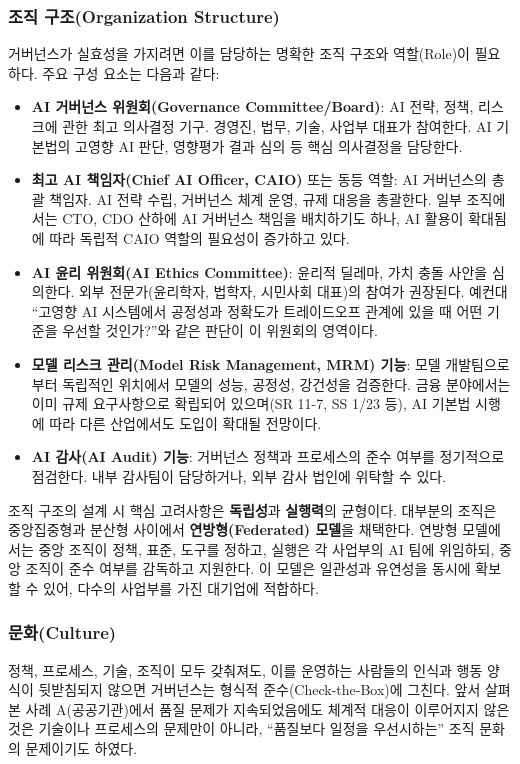 \subsubsection*{조직 구조(Organization Structure)}
거버넌스가 실효성을 가지려면 이를 담당하는 명확한 조직 구조와 역할(Role)이 필요하다. 주요 구성 요소는 다음과 같다:
\begin{itemize}
 \item \textbf{AI 거버넌스 위원회(Governance Committee/Board)}: AI 전략, 정책, 리스크에 관한 최고 의사결정 기구. 경영진, 법무, 기술, 사업부 대표가 참여한다. AI 기본법의 고영향 AI 판단, 영향평가 결과 심의 등 핵심 의사결정을 담당한다.
 \item \textbf{최고 AI 책임자(Chief AI Officer, CAIO)} 또는 동등 역할: AI 거버넌스의 총괄 책임자. AI 전략 수립, 거버넌스 체계 운영, 규제 대응을 총괄한다. 일부 조직에서는 CTO, CDO 산하에 AI 거버넌스 책임을 배치하기도 하나, AI 활용이 확대됨에 따라 독립적 CAIO 역할의 필요성이 증가하고 있다.
 \item \textbf{AI 윤리 위원회(AI Ethics Committee)}: 윤리적 딜레마, 가치 충돌 사안을 심의한다. 외부 전문가(윤리학자, 법학자, 시민사회 대표)의 참여가 권장된다. 예컨대 ``고영향 AI 시스템에서 공정성과 정확도가 트레이드오프 관계에 있을 때 어떤 기준을 우선할 것인가?''와 같은 판단이 이 위원회의 영역이다.
 \item \textbf{모델 리스크 관리(Model Risk Management, MRM) 기능}: 모델 개발팀으로부터 독립적인 위치에서 모델의 성능, 공정성, 강건성을 검증한다. 금융 분야에서는 이미 규제 요구사항으로 확립되어 있으며(SR 11-7, SS 1/23 등), AI 기본법 시행에 따라 다른 산업에서도 도입이 확대될 전망이다.
 \item \textbf{AI 감사(AI Audit) 기능}: 거버넌스 정책과 프로세스의 준수 여부를 정기적으로 점검한다. 내부 감사팀이 담당하거나, 외부 감사 법인에 위탁할 수 있다.
\end{itemize}

조직 구조의 설계 시 핵심 고려사항은 \textbf{독립성}과 \textbf{실행력}의 균형이다. 대부분의 조직은 중앙집중형과 분산형 사이에서 \textbf{연방형(Federated) 모델}을 채택한다. 연방형 모델에서는 중앙 조직이 정책, 표준, 도구를 정하고, 실행은 각 사업부의 AI 팀에 위임하되, 중앙 조직이 준수 여부를 감독하고 지원한다.\cite{mantymaki2022defining} 이 모델은 일관성과 유연성을 동시에 확보할 수 있어, 다수의 사업부를 가진 대기업에 적합하다.

\subsubsection*{문화(Culture)}
정책, 프로세스, 기술, 조직이 모두 갖춰져도, 이를 운영하는 사람들의 인식과 행동 양식이 뒷받침되지 않으면 거버넌스는 형식적 준수(Check-the-Box)에 그친다. 앞서 살펴본 사례 A(공공기관)에서 품질 문제가 지속되었음에도 체계적 대응이 이루어지지 않은 것은 기술이나 프로세스의 문제만이 아니라, ``품질보다 일정을 우선시하는'' 조직 문화의 문제이기도 하였다.

